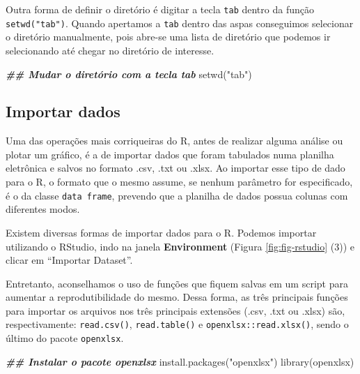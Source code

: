 \documentclass[
]{book}
\newenvironment{Shaded}{\begin{snugshade}}{\end{snugshade}}
\newcommand{\DocumentationTok}[1]{\textcolor[rgb]{0.37,0.37,0.37}{\textbf{\textit{#1}}}}
\newcommand{\FunctionTok}[1]{\textcolor[rgb]{0,0,0}{#1}}
\newcommand{\NormalTok}[1]{#1}
\newcommand{\StringTok}[1]{\textcolor[rgb]{0.5,0.5,0.5}{#1}}
\begin{document}
Outra forma de definir o diretório é digitar a tecla \texttt{tab} dentro da função \texttt{setwd("tab")}. Quando apertamos a \texttt{tab} dentro das aspas conseguimos selecionar o diretório manualmente, pois abre-se uma lista de diretório que podemos ir selecionando até chegar no diretório de interesse.

\begin{Shaded}
\begin{Highlighting}[]
\DocumentationTok{\#\# Mudar o diretório com a tecla tab}
\FunctionTok{setwd}\NormalTok{(}\StringTok{"\textasciigrave{}tab\textasciigrave{}"}\NormalTok{)}
\end{Highlighting}
\end{Shaded}

\hypertarget{importar-dados}{%
\subsection{Importar dados}\label{importar-dados}}

Uma das operações mais corriqueiras do R, antes de realizar alguma análise ou plotar um gráfico, é a de importar dados que foram tabulados numa planilha eletrônica e salvos no formato .csv, .txt ou .xlsx. Ao importar esse tipo de dado para o R, o formato que o mesmo assume, se nenhum parâmetro for especificado, é o da classe \texttt{data\ frame}, prevendo que a planilha de dados possua colunas com diferentes modos.

Existem diversas formas de importar dados para o R. Podemos importar utilizando o RStudio, indo na janela \textbf{Environment} (Figura \ref{fig:fig-rstudio} (3)) e clicar em ``Importar Dataset''.

Entretanto, aconselhamos o uso de funções que fiquem salvas em um script para aumentar a reprodutibilidade do mesmo. Dessa forma, as três principais funções para importar os arquivos nos três principais extensões (.csv, .txt ou .xlsx) são, respectivamente: \texttt{read.csv()}, \texttt{read.table()} e \texttt{openxlsx::read.xlsx()}, sendo o último do pacote \texttt{openxlsx}.

\begin{Shaded}
\begin{Highlighting}[]
\DocumentationTok{\#\# Instalar o pacote openxlsx}
\FunctionTok{install.packages}\NormalTok{(}\StringTok{"openxlsx"}\NormalTok{)}
\FunctionTok{library}\NormalTok{(openxlsx)}
\end{Highlighting}
\end{Shaded}
\end{document}
